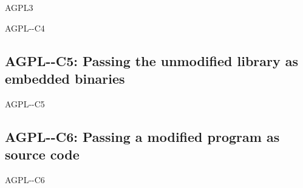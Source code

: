 \begin{license}{AGPL3}
\begin{lsuc}{AGPL-\ver-C4}
  \useCaseFour

  \begin{lsucrequires}
    \lsucmandatory{\keepLicenseElements}
    \lsucmandatory{\gplthreeEnsureCopyrightNoticeSource}
    \lsucmandatory{\giveLicense}\passingFilesCorrectly
    \lsucmandatory{\retainCopyrightNotices}
    \lsucmandatory{\addToCopyrightDialogLib}
    \lsucmandatory{\arrangeEnclosingSources}
    \lsucoptional{\addToDocumentation}
  \end{lsucrequires}

  \begin{lsucprohibits}
    \lsucitem{\noPatentLitigation}
  \end{lsucprohibits}
\end{lsuc}

\subsection{AGPL-\ver-C5: Passing the unmodified library as embedded binaries} 
\begin{lsuc}{AGPL-\ver-C5}

  \useCaseFive

  \begin{lsucrequires}
    \lsucmandatory{\keepLicenseElements}
    \lsucmandatory{\gplthreeEnsureCopyrightNoticeBinary}
    \lsucmandatory{\giveLicense}\passingFilesCorrectly
    \lsucmandatory{\makeAllSourcesAvailable}
    \lsucmandatory{\describeHowToGetSource}
    \lsucmandatory{\addToCopyrightDialogLib}
    \lsucmandatory{\arrangeEnclosingBinaries}
    \lsucmandatory{\retainCopyrightNotices}
    \lsucoptional{\addToDocumentation}
  \end{lsucrequires}

  \begin{lsucprohibits}
    \lsucitem{\noPatentLitigation}
  \end{lsucprohibits}
\end{lsuc}

\subsection{AGPL-\ver-C6: Passing a modified program as source code}
\begin{lsuc}{AGPL-\ver-C6}


\end{lsuc}
\end{license}

